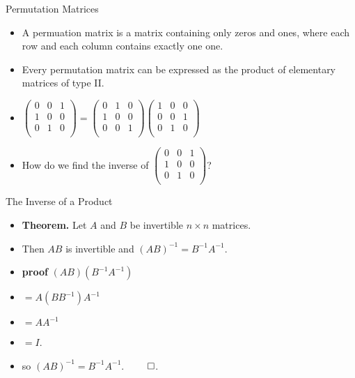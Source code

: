 \documentclass{beamer}
\begin{document}
\begin{frame}{Permutation Matrices}

\begin{itemize}
\item A permuation matrix is a matrix containing
only zeros and ones, where each row and each column contains exactly one one.
\item Every permutation matrix can be expressed as the product of elementary
matrices of type II.
\item $
\begin{pmatrix}
0 & 0 & 1 \\
1 & 0 & 0 \\
0 & 1 & 0 \\
\end{pmatrix}
=
\begin{pmatrix}
0 & 1 & 0 \\
1 & 0 & 0 \\
0 & 0 & 1 \\
\end{pmatrix}
\begin{pmatrix}
1 & 0 & 0 \\
0 & 0 & 1 \\
0 & 1 & 0 \\
\end{pmatrix}
$
\item How do we find the inverse of
$
\begin{pmatrix}
0 & 0 & 1 \\
1 & 0 & 0 \\
0 & 1 & 0 \\
\end{pmatrix}
$?
\end{itemize}
\end{frame}

\begin{frame}{The Inverse of a Product}

\begin{itemize}
\item \textbf{Theorem.} Let $A$ and $B$ be invertible $n\times n$ matrices.
\item Then $AB$ is invertible and $\left(AB\right)^{-1} = B^{-1} A^{-1}$.
\item \textbf{proof} $\left(AB\right)\left(B^{-1} A^{-1}\right)$
\item $= A(B B^{-1})A^{-1}$
\item $= A A^{-1}$
\item $=I$.
\item so $(AB)^{-1} = B^{-1} A^{-1}$. $\qed$.
\end{itemize}
\end{frame}
\end{document}
